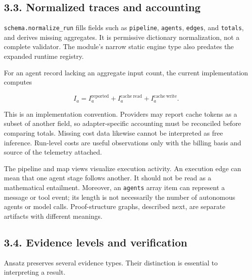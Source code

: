 \documentclass[11pt,a4paper]{article}
\begin{document}
\subsection*{3.3. Normalized traces and accounting}

\nolinkurl{schema.normalize_run} fills fields such as \nolinkurl{pipeline}, \nolinkurl{agents}, \nolinkurl{edges}, and \nolinkurl{totals}, and derives missing aggregates. It is permissive dictionary normalization, not a complete validator. The module's narrow static engine type also predates the expanded runtime registry.

For an agent record lacking an aggregate input count, the current implementation computes

\[
I_a=I_a^{\mathrm{reported}}+I_a^{\mathrm{cache\ read}}+I_a^{\mathrm{cache\ write}}.
\]

This is an implementation convention. Providers may report cache tokens as a subset of another field, so adapter-specific accounting must be reconciled before comparing totals. Missing cost data likewise cannot be interpreted as free inference. Run-level costs are useful observations only with the billing basis and source of the telemetry attached.

The pipeline and map views visualize execution activity. An execution edge can mean that one agent stage follows another. It should not be read as a mathematical entailment. Moreover, an \nolinkurl{agents} array item can represent a message or tool event; its length is not necessarily the number of autonomous agents or model calls. Proof-structure graphs, described next, are separate artifacts with different meanings.

\subsection*{3.4. Evidence levels and verification}

Ansatz preserves several evidence types. Their distinction is essential to interpreting a result.
\end{document}
